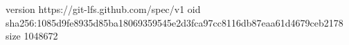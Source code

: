 version https://git-lfs.github.com/spec/v1
oid sha256:1085d9fe8935d85ba18069359545e2d3fca97cc8116db87eaa61d4679ceb2178
size 1048672
